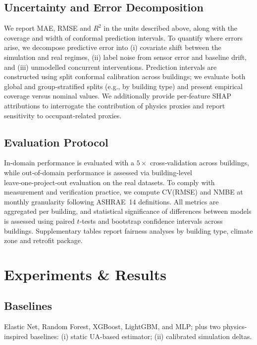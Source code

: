 ﻿\documentclass{article}
\begin{document}
\subsection{Uncertainty and Error Decomposition}
We report MAE, RMSE and $R^2$ in the units described above, along with the coverage and width of conformal prediction intervals.
To quantify where errors arise, we decompose predictive error into (i) covariate shift between the simulation and real regimes, (ii) label noise from sensor error and baseline drift, and (iii) unmodelled concurrent interventions.
Prediction intervals are constructed using split conformal calibration across buildings;
we evaluate both global and group‑stratified splits (e.g., by building type) and present empirical coverage versus nominal values.
We additionally provide per‑feature SHAP attributions to interrogate the contribution of physics proxies and report sensitivity to occupant‑related proxies.

\subsection{Evaluation Protocol}
In‑domain performance is evaluated with a $5\times$ cross‑validation across buildings, while out‑of‑domain performance is assessed via building-level leave‑one‑project‑out evaluation on the real datasets.
To comply with measurement and verification practice, we compute CV(RMSE) and NMBE at monthly granularity following ASHRAE~14 definitions.
All metrics are aggregated per building, and statistical significance of differences between models is assessed using paired $t$‑tests and bootstrap confidence intervals across buildings.
Supplementary tables report fairness analyses by building type, climate zone and retrofit package.

\section{Experiments \& Results}
\subsection{Baselines}
Elastic Net, Random Forest, XGBoost, LightGBM, and MLP; plus two physics-inspired baselines: (i) static UA-based estimator;
(ii) calibrated simulation deltas.
\end{document}
